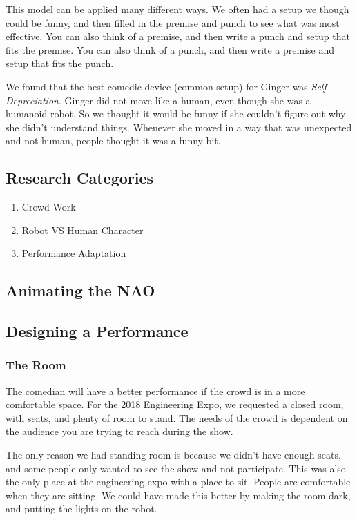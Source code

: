 This model can be applied many different ways.
We often had a setup we though could be funny, and then filled in the premise and punch to see what was most effective.
You can also think of a premise, and then write a punch and setup that fits the premise.
You can also think of a punch, and then write a premise and setup that fits the punch.

We found that the best comedic device (common setup) for Ginger was \textit{Self-Depreciation}.
Ginger did not move like a human, even though she was a humanoid robot.
So we thought it would be funny if she couldn't figure out why she didn't understand things.
Whenever she moved in a way that was unexpected and not human, people thought it was a funny bit.

\subsection{Research Categories}

		\begin{enumerate}
			\item Crowd Work
			\item Robot VS Human Character
			\item Performance Adaptation
		\end{enumerate}

\subsection{Animating the NAO}
\subsection{Designing a Performance}

    \subsubsection{The Room}
    The comedian will have a better performance if the crowd is in a more comfortable space.
    For the 2018 Engineering Expo, we requested a closed room, with seats, and plenty of room to stand.
    The needs of the crowd is dependent on the audience you are trying to reach during the show.


    The only reason we had standing room is because we didn't have enough seats, and some people only wanted to see the show and not participate.
    This was also the only place at the engineering expo with a place to sit.
    People are comfortable when they are sitting.
    We could have made this better by making the room dark, and putting the lights on the robot.

